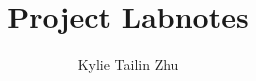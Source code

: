 \documentclass[a4paper,12pt]{article}
\title{Project Labnotes}
\author{Kylie Tailin Zhu}
\begin{document}
\maketitle




\printbibliography

\def\bibsection{\vskip 6pt \setlength{\parindent}{0pt}{\section{References}} \setlength{\parindent}{12pt}}
\end{document}
